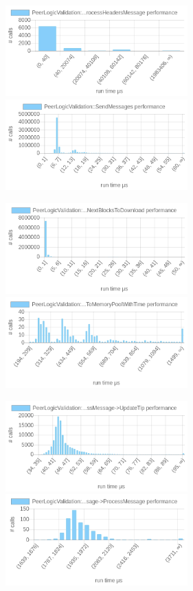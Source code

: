 \documentclass{article}
\begin{document}
\includegraphics[width=7cm]{images/london/chartPeerLogicValidation_3A_3AProcessMessages-_3EProcessMessage-_3EProcessHeadersMessage.png}
\includegraphics[width=7cm]{images/london/chartPeerLogicValidation_3A_3ASendMessages.png}

\includegraphics[width=7cm]{images/london/chartPeerLogicValidation_3A_3ASendMessages-_3EFindNextBlocksToDownload.png}
\includegraphics[width=7cm]{images/london/chartPeerLogicValidation_3A_3AProcessMessages-_3EProcessMessage-_3EAcceptToMemoryPoolWithTime.png}

\includegraphics[width=7cm]{images/london/chartPeerLogicValidation_3A_3AProcessMessages-_3EProcessMessage-_3EUpdateTip.png}
\includegraphics[width=7cm]{images/london/chartPeerLogicValidation_3A_3AProcessMessages-_3EProcessMessage-_3EProcessMessage.png}
\end{document}
